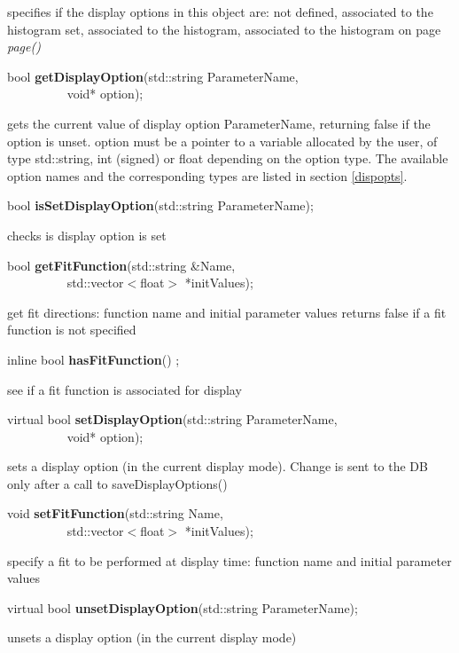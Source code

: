  specifies if the display options in this object are: not defined,
 associated to the histogram set, associated to the histogram,
 associated to the histogram on  page {\it page()}


\item    bool {\bf getDisplayOption}(std::string ParameterName,\\\mbox{}~~~~~~~~~
			void* option);

 gets the current value of display option ParameterName, returning false if
 the option is unset.
 option must be a pointer to a variable allocated by the user, of type 
 std::string, int (signed) or float depending on the option type.
 The available option names and the corresponding types are listed 
 in section \ref{dispopts}.


\item    bool {\bf isSetDisplayOption}(std::string ParameterName);


 checks is display option is set


\item    bool {\bf getFitFunction}(std::string \&Name,\\\mbox{}~~~~~~~~~ std::vector$<$float$>$ *initValues);


 get fit directions: function name and initial parameter values
 returns false if a fit function is not specified


\item    inline bool {\bf hasFitFunction}() ;

 see if a fit function is associated for display


\item    virtual bool {\bf setDisplayOption}(std::string ParameterName,\\\mbox{}~~~~~~~~~ void* option);


 sets a display option (in the current display mode). Change is sent to the DB only 
 after a call to saveDisplayOptions()


\item    void {\bf setFitFunction}(std::string Name,\\\mbox{}~~~~~~~~~ std::vector$<$float$>$ *initValues);


 specify a fit to be performed at display time: function name and initial parameter values


\item    virtual bool {\bf unsetDisplayOption}(std::string ParameterName);


 unsets a display option (in the current display mode)


